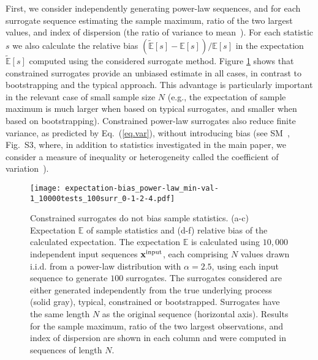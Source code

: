 \documentclass[%
prx,
reprint,
superscriptaddress,
nofootinbib,
 amsmath,amssymb,
 aps,
floatfix,
]{revtex4-2}
\newcommand{\xin}{{{\bf x}^{\text{input}}}}
\begin{document}
First, we consider independently generating power-law sequences, and for each surrogate sequence estimating the sample maximum, ratio of the two largest values, and index of dispersion (the ratio of variance to mean~\cite{perry1979power}). For each statistic $s$ we also calculate the relative bias $\left(\tilde{\mathbb{E}}[s] - \mathbb{E}[s]\right)/\mathbb{E}[s]$ in the expectation $\tilde{\mathbb{E}}[s]$ computed using the considered surrogate method.
Figure \ref{fig:mean_var_statistics} shows that constrained surrogates provide an unbiased estimate in all cases, in contrast to bootstrapping and the typical approach. This advantage is particularly important in the relevant case of  small sample size $N$ (e.g., the expectation of sample maximum is much larger when based on typical surrogates, and smaller when based on bootstrapping). Constrained power-law surrogates also reduce {finite} variance, as predicted by Eq.~(\ref{eq.var}), without introducing bias (see SM~\cite{supplemental}, {Fig.~S3}{, where, in addition to statistics investigated in the main paper, we consider a measure of inequality or heterogeneity called the coefficient of variation~\cite{champernowne1998economic}}).

\begin{figure}[htbp]
\texttt{[image: expectation-bias\_power-law\_min-val-1\_10000tests\_100surr\_0-1-2-4.pdf]}
\caption{
Constrained surrogates do not bias sample statistics. (a-c) Expectation $\mathbb{E}$ of sample statistics and (d-f) relative bias of the calculated expectation. The expectation
$\mathbb{E}$ is calculated using $10,000$ independent input sequences $\xin$, each comprising $N$ values drawn i.i.d. from a power-law distribution with $\alpha = 2.5$, using each input sequence to generate $100$ surrogates. The surrogates considered are either generated independently from the true underlying process (solid gray), typical, constrained or bootstrapped. Surrogates have the same length $N$ as the original sequence (horizontal axis). Results for the sample maximum, ratio of the two largest observations, and index of dispersion are shown in each column and were computed in sequences of length $N$. 
}
\label{fig:mean_var_statistics}
\end{figure}
\end{document}
